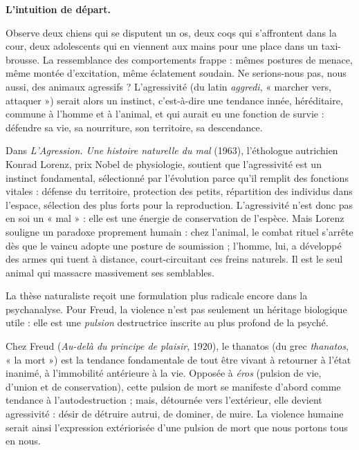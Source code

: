 \documentclass[11pt]{article}
\newcommand{\cle}[1]{{\popxbold\color{popdark}#1}}
\newcounter{popsec}
\newcounter{popsub}
\newcommand{\courssub}[1]{%
  \stepcounter{popsub}%
  \par\vspace{9pt}\noindent{\popxbold\fontsize{11.5}{13}\selectfont\color{popink}{\color{poporange}\thepopsec.\thepopsub}\hspace{6pt}#1}\par\nopagebreak\vspace{4pt}
}
\begin{document}
\courssub{La thèse naturaliste : la violence comme instinct}

\textbf{L'intuition de départ.}\par
Observe deux chiens qui se disputent un os, deux coqs qui s'affrontent dans la cour, deux adolescents qui en viennent aux mains pour une place dans un taxi-brousse. La ressemblance des comportements frappe : mêmes postures de menace, même montée d'excitation, même éclatement soudain. Ne serions-nous pas, nous aussi, des animaux agressifs ? L'\cle{agressivité} (du latin \emph{aggredi}, « marcher vers, attaquer ») serait alors un \cle{instinct}, c'est-à-dire une tendance innée, héréditaire, commune à l'homme et à l'animal, et qui aurait eu une fonction de survie : défendre sa vie, sa nourriture, son territoire, sa descendance.

\begin{propriete}
Dans \emph{L'Agression. Une histoire naturelle du mal} (1963), l'éthologue autrichien Konrad Lorenz, prix Nobel de physiologie, soutient que l'agressivité est un instinct fondamental, sélectionné par l'évolution parce qu'il remplit des fonctions vitales : défense du territoire, protection des petits, répartition des individus dans l'espace, sélection des plus forts pour la reproduction. L'agressivité n'est donc pas en soi un « mal » : elle est une énergie de conservation de l'espèce. Mais Lorenz souligne un paradoxe proprement humain : chez l'animal, le combat rituel s'arrête dès que le vaincu adopte une posture de soumission ; l'homme, lui, a développé des armes qui tuent à distance, court-circuitant ces freins naturels. Il est le seul animal qui massacre massivement ses semblables.
\end{propriete}

La thèse naturaliste reçoit une formulation plus radicale encore dans la psychanalyse. Pour Freud, la violence n'est pas seulement un héritage biologique utile : elle est une \emph{pulsion} destructrice inscrite au plus profond de la psyché.

\begin{definition}
Chez Freud (\emph{Au-delà du principe de plaisir}, 1920), le \cle{thanatos} (du grec \emph{thanatos}, « la mort ») est la tendance fondamentale de tout être vivant à retourner à l'état inanimé, à l'immobilité antérieure à la vie. Opposée à \emph{éros} (pulsion de vie, d'union et de conservation), cette pulsion de mort se manifeste d'abord comme tendance à l'autodestruction ; mais, détournée vers l'extérieur, elle devient \cle{agressivité} : désir de détruire autrui, de dominer, de nuire. La violence humaine serait ainsi l'expression extériorisée d'une pulsion de mort que nous portons tous en nous.
\end{definition}
\end{document}
